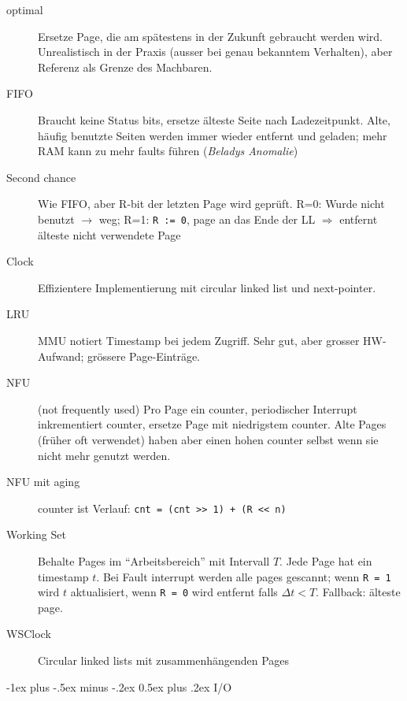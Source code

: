 \documentclass[10pt,landscape,a4paper]{article}
\makeatletter
\renewcommand{\section}{\@startsection{section}{1}{0mm}%
                                {-1ex plus -.5ex minus -.2ex}%
                                {0.5ex plus .2ex}%
                                {\normalfont\large\bfseries}}
\makeatother
\begin{document}
\begin{multicols*}{3}
\begin{description}
  \item[optimal] Ersetze Page, die am spätestens in der Zukunft gebraucht werden
    wird. Unrealistisch in der Praxis (ausser bei genau bekanntem Verhalten), aber
    Referenz als Grenze des Machbaren.
  \item[FIFO] Braucht keine Status bits, ersetze älteste Seite nach Ladezeitpunkt.
    Alte, häufig benutzte Seiten werden immer wieder entfernt und geladen; mehr
    RAM kann zu mehr faults führen (\emph{Beladys Anomalie})
  \item[Second chance] Wie FIFO, aber R-bit der letzten Page wird geprüft. R=0:
    Wurde nicht benutzt $\rightarrow$ weg; R=1: \verb|R := 0|, page an das Ende
    der LL $\Rightarrow$ entfernt älteste nicht verwendete Page
  \item[Clock] Effizientere Implementierung mit circular linked list und next-pointer.
  \item[LRU] MMU notiert Timestamp bei jedem Zugriff. Sehr gut, aber grosser
    HW-Aufwand; grössere Page-Einträge.
  \item[NFU] (not frequently used) Pro Page ein counter, periodischer Interrupt
    inkrementiert counter, ersetze Page mit niedrigstem counter. Alte Pages
    (früher oft verwendet) haben aber einen hohen counter selbst wenn sie nicht
    mehr genutzt werden.
  \item[NFU mit aging] counter ist Verlauf: \verb|cnt = (cnt >> 1) + (R << n)|
  \item[Working Set] Behalte Pages im ``Arbeitsbereich'' mit Intervall $T$. Jede
    Page hat ein timestamp $t$. Bei Fault interrupt werden alle pages gescannt;
    wenn \verb|R = 1| wird $t$ aktualisiert, wenn \verb|R = 0| wird entfernt
    falls $\Delta{}t < T$. Fallback: älteste page.
  \item[WSClock] Circular linked lists mit zusammenhängenden Pages
\end{description}

\section{I/O}


\end{multicols*}
\end{document}
